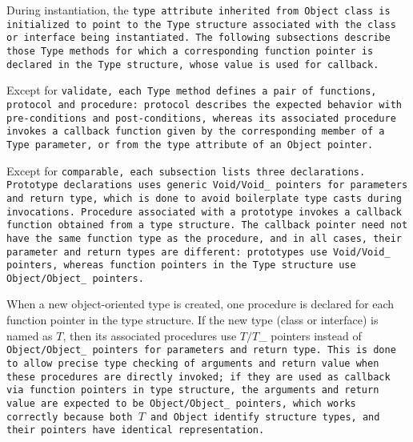 \def\Subsection#1{\subsection{\idxy{struct Type}{#1}}
\index{Type@\tt{Type}!#1@\tt{#1}}}

During instantiation, the \tt{type} attribute inherited from
\tt{Object} class is initialized to point to the \tt{Type}
structure associated with the class or interface being instantiated.
The following subsections describe those \tt{Type} methods
for which a corresponding function pointer is declared in
the \tt{Type} structure, whose value is used for callback.

Except for \tt{validate}, each \tt{Type} method defines a pair of functions,
protocol and procedure: protocol describes the expected behavior with
pre-conditions and post-conditions, whereas its associated procedure invokes
a callback function given by the corresponding member of a \tt{Type}
parameter, or from the \tt{type} attribute of an \tt{Object} pointer.

Except for \tt{comparable}, each subsection lists three declarations.
Prototype declarations uses generic \tt{Void/Void_} pointers for parameters and
return type, which is done to avoid boilerplate type casts during invocations.
Procedure associated with a prototype invokes a
callback function obtained from a type structure.
The callback pointer need not have the same function type as the procedure,
and in all cases, their parameter and return types are different:
prototypes use \tt{Void}/\tt{Void_} pointers, whereas function pointers
in the \tt{Type} structure use \tt{Object}/\tt{Object_} pointers.

When a new object-oriented type is created, one procedure
is declared for each function pointer in the type structure.
If the new type (class or interface) is named as $T$,
then its associated procedures use $T/T$\_ pointers instead of
\tt{Object/Object_} pointers for parameters and return type.
This is done to allow precise type checking of arguments and return value when
these procedures are directly invoked; if they are used as callback via function
pointers in type structure, the arguments and return value are expected to be
\tt{Object/Object_} pointers, which works correctly because both $T$ and \tt{Object}
identify structure types, and their pointers have identical representation.

\subsection{}


